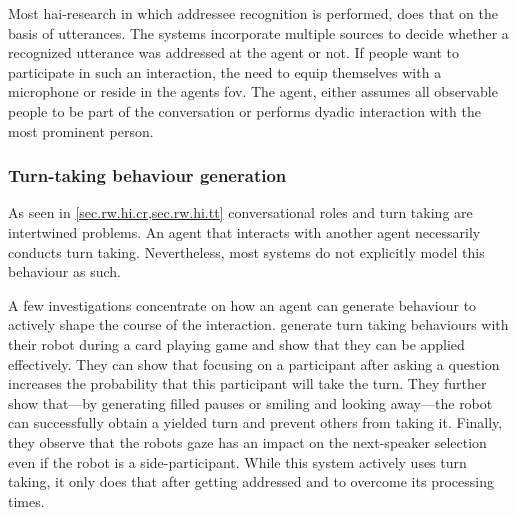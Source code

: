 
Most \gls{hai}-research in which \gls{addressee} recognition is performed, does that on the basis of utterances.
The systems incorporate multiple sources to decide whether a recognized utterance was addressed at the agent or not.
If people want to participate in such an interaction, the need to equip themselves with a microphone or reside in the agents \gls{fov}.
The agent, either assumes all observable people to be part of the \gls{conversation} or performs dyadic interaction with the most prominent person.

\subsubsection{Turn-taking behaviour generation}\label{sec.rw.hi.focused-rw.turntaking}

As seen in \cref{sec.rw.hi.cr,sec.rw.hi.tt} \glspl{conversational role} and \gls{turn taking} are intertwined problems.
An agent that interacts with another agent necessarily conducts \gls{turn} taking.
Nevertheless, most systems do not explicitly model this behaviour as such.

A few investigations concentrate on how an agent can generate behaviour to actively shape the course of the interaction.
 generate \gls{turn} taking behaviours with their \gls{robot} during a card playing game and show that they can be applied effectively.
They can show that focusing on a participant after asking a question increases the probability that this participant will take the \gls{turn}.
They further show that---by generating filled pauses or smiling and looking away---the \gls{robot} can successfully obtain a yielded \gls{turn} and prevent others from taking it.
Finally, they observe that the \glspl{robot} gaze has an impact on the next-\gls{speaker} selection even if the \gls{robot} is a \gls{side-participant}.
While this system actively uses \gls{turn taking}, it only does that after getting addressed and to overcome its processing times.

